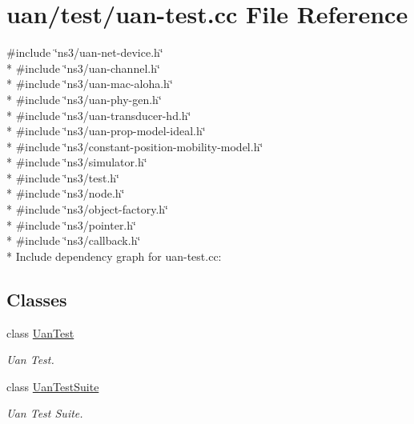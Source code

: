 \hypertarget{uan-test_8cc}{}\section{uan/test/uan-\/test.cc File Reference}
\label{uan-test_8cc}
{\ttfamily \#include \char`\"{}ns3/uan-\/net-\/device.\+h\char`\"{}}\\*
{\ttfamily \#include \char`\"{}ns3/uan-\/channel.\+h\char`\"{}}\\*
{\ttfamily \#include \char`\"{}ns3/uan-\/mac-\/aloha.\+h\char`\"{}}\\*
{\ttfamily \#include \char`\"{}ns3/uan-\/phy-\/gen.\+h\char`\"{}}\\*
{\ttfamily \#include \char`\"{}ns3/uan-\/transducer-\/hd.\+h\char`\"{}}\\*
{\ttfamily \#include \char`\"{}ns3/uan-\/prop-\/model-\/ideal.\+h\char`\"{}}\\*
{\ttfamily \#include \char`\"{}ns3/constant-\/position-\/mobility-\/model.\+h\char`\"{}}\\*
{\ttfamily \#include \char`\"{}ns3/simulator.\+h\char`\"{}}\\*
{\ttfamily \#include \char`\"{}ns3/test.\+h\char`\"{}}\\*
{\ttfamily \#include \char`\"{}ns3/node.\+h\char`\"{}}\\*
{\ttfamily \#include \char`\"{}ns3/object-\/factory.\+h\char`\"{}}\\*
{\ttfamily \#include \char`\"{}ns3/pointer.\+h\char`\"{}}\\*
{\ttfamily \#include \char`\"{}ns3/callback.\+h\char`\"{}}\\*
Include dependency graph for uan-\/test.cc\+:
\subsection*{Classes}
\begin{DoxyCompactItemize}
\item 
class \hyperlink{classUanTest}{Uan\+Test}
\begin{DoxyCompactList}\small\item\em Uan Test. \end{DoxyCompactList}\item 
class \hyperlink{classUanTestSuite}{Uan\+Test\+Suite}
\begin{DoxyCompactList}\small\item\em Uan Test Suite. \end{DoxyCompactList}\end{DoxyCompactItemize}
